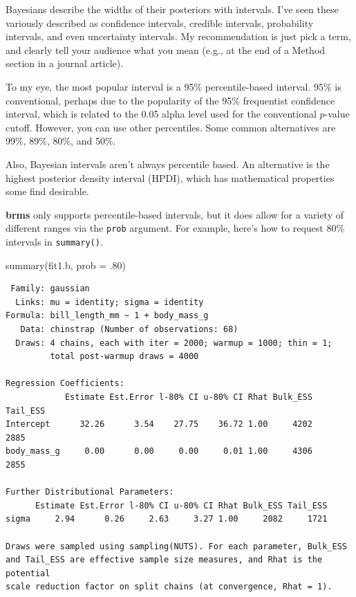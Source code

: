 \documentclass[
  letterpaper,
  DIV=11,
  numbers=noendperiod]{scrartcl}
\newenvironment{Shaded}{\begin{snugshade}}{\end{snugshade}}
\newcommand{\AttributeTok}[1]{\textcolor[rgb]{0.40,0.45,0.13}{#1}}
\newcommand{\DecValTok}[1]{\textcolor[rgb]{0.68,0.00,0.00}{#1}}
\newcommand{\FunctionTok}[1]{\textcolor[rgb]{0.28,0.35,0.67}{#1}}
\newcommand{\NormalTok}[1]{\textcolor[rgb]{0.00,0.23,0.31}{#1}}
\begin{document}
Bayesians describe the widths of their posteriors with intervals. I've
seen these variously described as confidence intervals, credible
intervals, probability intervals, and even uncertainty intervals. My
recommendation is just pick a term, and clearly tell your audience what
you mean (e.g., at the end of a Method section in a journal article).

To my eye, the most popular interval is a 95\% percentile-based
interval. 95\% is conventional, perhaps due to the popularity of the
95\% frequentist confidence interval, which is related to the 0.05 alpha
level used for the conventional \(p\)-value cutoff. However, you can use
other percentiles. Some common alternatives are 99\%, 89\%, 80\%, and
50\%.

Also, Bayesian intervals aren't always percentile based. An alternative
is the highest posterior density interval (HPDI), which has mathematical
properties some find desirable.

\textbf{brms} only supports percentile-based intervals, but it does
allow for a variety of different ranges via the \texttt{prob} argument.
For example, here's how to request 80\% intervals in \texttt{summary()}.

\begin{Shaded}
\begin{Highlighting}[]
\FunctionTok{summary}\NormalTok{(fit1.b, }\AttributeTok{prob =}\NormalTok{ .}\DecValTok{80}\NormalTok{)}
\end{Highlighting}
\end{Shaded}

\begin{verbatim}
 Family: gaussian 
  Links: mu = identity; sigma = identity 
Formula: bill_length_mm ~ 1 + body_mass_g 
   Data: chinstrap (Number of observations: 68) 
  Draws: 4 chains, each with iter = 2000; warmup = 1000; thin = 1;
         total post-warmup draws = 4000

Regression Coefficients:
            Estimate Est.Error l-80% CI u-80% CI Rhat Bulk_ESS Tail_ESS
Intercept      32.26      3.54    27.75    36.72 1.00     4202     2885
body_mass_g     0.00      0.00     0.00     0.01 1.00     4306     2855

Further Distributional Parameters:
      Estimate Est.Error l-80% CI u-80% CI Rhat Bulk_ESS Tail_ESS
sigma     2.94      0.26     2.63     3.27 1.00     2082     1721

Draws were sampled using sampling(NUTS). For each parameter, Bulk_ESS
and Tail_ESS are effective sample size measures, and Rhat is the potential
scale reduction factor on split chains (at convergence, Rhat = 1).
\end{verbatim}
\end{document}
